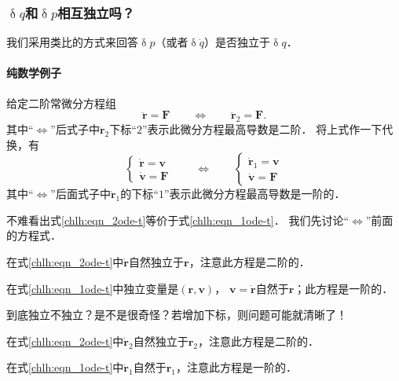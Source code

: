 \subsubsection{$\updelta q$和$\updelta p$相互独立吗？} \label{chlh:sec_q-INDE-p}

我们采用类比的方式来回答$\updelta p$（或者$\updelta \dot{q}$）是否独立于$\updelta q$．

\paragraph{纯数学例子}
给定二阶常微分方程组
\begin{equation}\label{chlh:eqn_2ode-t}
    \ddot{\boldsymbol{r}} = \boldsymbol{F} \qquad \Leftrightarrow \qquad
    \ddot{\boldsymbol{r}}_2 = \boldsymbol{F}.
\end{equation}
其中“$\Leftrightarrow$”后式子中$\ddot{\boldsymbol{r}}_2$下标“$2$”表示此微分方程最高导数是二阶．
将上式作一下代换，有
\begin{equation}\label{chlh:eqn_1ode-t}
    \begin{cases}
        \dot{\boldsymbol{r}} = \boldsymbol{v} \\
        \dot{\boldsymbol{v}} = \boldsymbol{F}
    \end{cases}
    \qquad \Leftrightarrow \qquad
    \begin{cases}
        \dot{\boldsymbol{r}}_1 = \boldsymbol{v} \\
        \dot{\boldsymbol{v}} = \boldsymbol{F}
    \end{cases}
\end{equation}
其中“$\Leftrightarrow$”后面式子中$\dot{\boldsymbol{r}}_1$的下标“$1$”表示此微分方程最高导数是一阶的．

不难看出式\eqref{chlh:eqn_2ode-t}等价于式\eqref{chlh:eqn_1ode-t}．
我们先讨论“$\Leftrightarrow$”前面的方程式．

在式\eqref{chlh:eqn_2ode-t}中$\dot{\boldsymbol{r}}$自然独立于$\boldsymbol{r}$，注意此方程是二阶的．

在式\eqref{chlh:eqn_1ode-t}中独立变量是$(\boldsymbol{r}, \boldsymbol{v})$，
$\boldsymbol{v}=\dot{\boldsymbol{r}}$自然于$\boldsymbol{r}$；此方程是一阶的．


到底独立不独立？是不是很奇怪？若增加下标，则问题可能就清晰了！

在式\eqref{chlh:eqn_2ode-t}中$\dot{\boldsymbol{r}}_2$自然独立于$\boldsymbol{r}_2$，注意此方程是二阶的．

在式\eqref{chlh:eqn_1ode-t}中$\dot{\boldsymbol{r}}_1$自然于$\boldsymbol{r}_1$，注意此方程是一阶的．

